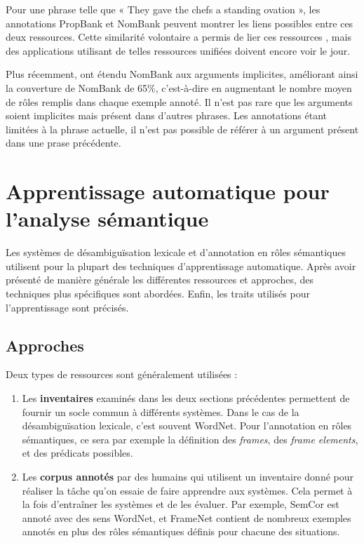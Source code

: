 Pour une phrase telle que « They gave the chefs a standing ovation », les
annotations PropBank et NomBank peuvent montrer les liens possibles entre ces
deux ressources. Cette similarité volontaire a permis de lier ces ressources
\citep{pustejovsky2005merging,verhagen2007combining}, mais des applications
utilisant de telles ressources unifiées doivent encore voir le jour.

Plus récemment, \cite{gerber2010beyond} ont étendu NomBank aux arguments
implicites, améliorant ainsi la couverture de NomBank de 65\%, c'est-à-dire en
augmentant le nombre moyen de rôles remplis dans chaque exemple annoté. Il
n'est pas rare que les arguments soient implicites mais présent dans d'autres
phrases. Les annotations étant limitées à la phrase actuelle, il n'est pas
possible de référer à un argument présent dans une prase précédente.

\section{Apprentissage automatique pour l'analyse sémantique}

Les systèmes de désambiguïsation lexicale et d'annotation en rôles sémantiques
utilisent pour la plupart des techniques d'apprentissage automatique. Après
avoir présenté de manière générale les différentes ressources et approches, des
techniques plus spécifiques sont abordées. Enfin, les traits utilisés pour
l'apprentissage sont précisés.

\subsection{Approches}

Deux types de ressources sont généralement utilisées :

\begin{enumerate}

    \item Les \textbf{inventaires} examinés dans les deux sections précédentes
        permettent de fournir un socle commun à différents systèmes. Dans le
        cas de la désambiguïsation lexicale, c'est souvent WordNet. Pour
        l'annotation en rôles sémantiques, ce sera par exemple la définition
        des \textit{frames}, des \textit{frame elements}, et des prédicats
        possibles.

    \item Les \textbf{corpus annotés} par des humains qui utilisent un
        inventaire donné pour réaliser la tâche qu'on essaie de faire apprendre
        aux systèmes. Cela permet à la fois d'entraîner les systèmes et de les
        évaluer. Par exemple, SemCor est annoté avec des sens WordNet, et
        FrameNet contient de nombreux exemples annotés en plus des rôles
        sémantiques définis pour chacune des situations.

\end{enumerate}

